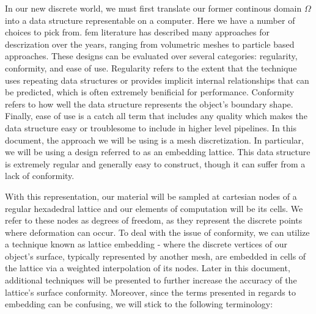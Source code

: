 \documentclass[12pt,oneside,letterpaper]{memoir}
\begin{document}
In our new discrete world, we must first translate our former
continous domain $\Omega$ into a data structure representable on a
computer. Here we have a number of choices to pick from. \gls{fem}
literature has described many approaches for descrization over the
years, ranging from volumetric meshes to particle based
approaches. These designs can be evaluated over several categories:
regularity, conformity, and ease of use. Regularity refers to the
extent that the technique uses repeating data structures or provides
implicit internal relationships that can be predicted, which is often
extremely benificial for performance. Conformity refers to how well
the data structure represents the object's boundary shape. Finally,
ease of use is a catch all term that includes any quality which makes
the data structure easy or troublesome to include in higher level
pipelines. In this document, the approach we will be using is a mesh
discretization. In particular, we will be using a design referred to
as an embedding lattice. This data structure is extremely regular and
generally easy to construct, though it can suffer from a lack of
conformity. 

With this representation, our material will be sampled at cartesian
nodes of a regular hexadedral lattice and our elements of computation
will be its cells. We refer to these nodes as degrees of freedom, as
they represent the discrete points where deformation can occur. To
deal with the issue of conformity, we can utilize a technique known as
lattice embedding - where the discrete vertices of our object's
surface, typically represented by another mesh, are embedded in cells
of the lattice via a weighted interpolation of its nodes. Later in
this document, additional techniques will be presented to further
increase the accuracy of the lattice's surface conformity. Moreover,
since the terms presented in regards to embedding can be confusing, we
will stick to the following terminology:
\end{document}

